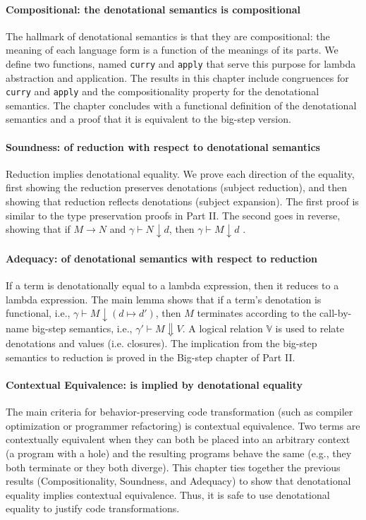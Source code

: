 \documentclass[preprint,authoryear]{elsarticle}
\begin{document}
\paragraph{Compositional: the denotational semantics is compositional}
The hallmark of denotational semantics is that they are compositional:
the meaning of each language form is a function of the meanings of its
parts.
%
We define two functions, named \texttt{curry} and \texttt{apply} that
serve this purpose for lambda abstraction and application.
%
The results in this chapter include congruences for \texttt{curry} and
\texttt{apply} and the compositionality property for the denotational
semantics.
%
The chapter concludes with a functional definition of the denotational
semantics and a proof that it is equivalent to the big-step version.

\paragraph{Soundness: of reduction with respect to denotational semantics}
Reduction implies denotational equality. We prove each direction of
the equality, first showing the reduction preserves denotations
(subject reduction), and then showing that reduction reflects
denotations (subject expansion). The first proof is similar to the
type preservation proofs in Part II. The second goes in reverse,
showing that if $M \longrightarrow N$ and $\gamma \vdash N
\downarrow d$, then $\gamma \vdash M \downarrow d$ .

\paragraph{Adequacy: of denotational semantics with respect to reduction}
If a term is denotationally equal to a lambda expression, then it
reduces to a lambda expression. The main lemma shows that if a term's
denotation is functional, i.e., $\gamma \vdash M \downarrow (d \mapsto
d')$, then $M$ terminates according to the call-by-name big-step
semantics, i.e., $\gamma' \vdash M \Downarrow V$. A logical relation
$\mathbb{V}$ is used to relate denotations and values (i.e. closures).
The implication from the big-step semantics to reduction is proved in
the Big-step chapter of Part II.

\paragraph{Contextual Equivalence: is implied by denotational equality}
The main criteria for behavior-preserving code transformation (such as
compiler optimization or programmer refactoring) is contextual
equivalence. Two terms are contextually equivalent when they can both
be placed into an arbitrary context (a program with a hole) and the
resulting programs behave the same (e.g., they both terminate or they
both diverge). This chapter ties together the previous results
(Compositionality, Soundness, and Adequacy) to show that denotational
equality implies contextual equivalence. Thus, it is safe to use
denotational equality to justify code transformations.
\end{document}
